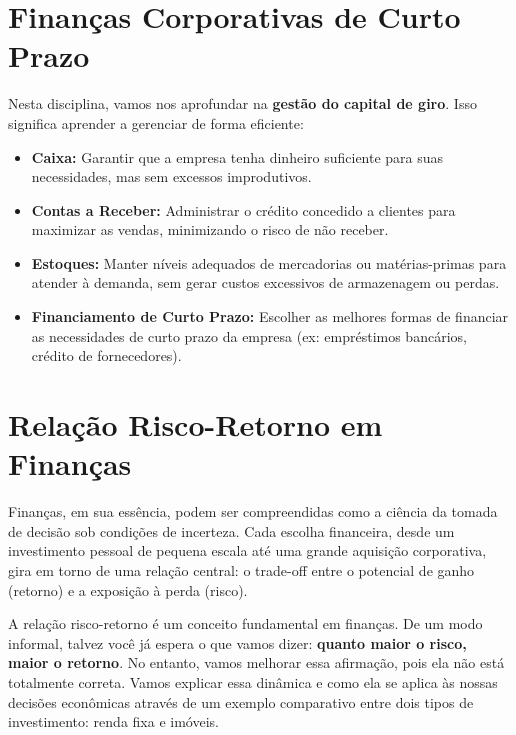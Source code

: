 \documentclass[
  a4paper,
]{book}
\begin{document}
\section{\texorpdfstring{\textbf{Finanças Corporativas de Curto
Prazo}}{Finanças Corporativas de Curto Prazo}}\label{finanuxe7as-corporativas-de-curto-prazo}

Nesta disciplina, vamos nos aprofundar na \textbf{gestão do capital de
giro}. Isso significa aprender a gerenciar de forma eficiente:

\begin{itemize}
\item
  \textbf{Caixa:} Garantir que a empresa tenha dinheiro suficiente para
  suas necessidades, mas sem excessos improdutivos.
\item
  \textbf{Contas a Receber:} Administrar o crédito concedido a clientes
  para maximizar as vendas, minimizando o risco de não receber.
\item
  \textbf{Estoques:} Manter níveis adequados de mercadorias ou
  matérias-primas para atender à demanda, sem gerar custos excessivos de
  armazenagem ou perdas.
\item
  \textbf{Financiamento de Curto Prazo:} Escolher as melhores formas de
  financiar as necessidades de curto prazo da empresa (ex: empréstimos
  bancários, crédito de fornecedores).
\end{itemize}

\section{Relação Risco-Retorno em
Finanças}\label{relauxe7uxe3o-risco-retorno-em-finanuxe7as}

Finanças, em sua essência, podem ser compreendidas como a ciência da
tomada de decisão sob condições de incerteza. Cada escolha financeira,
desde um investimento pessoal de pequena escala até uma grande aquisição
corporativa, gira em torno de uma relação central: o trade-off entre o
potencial de ganho (retorno) e a exposição à perda (risco).

A relação risco-retorno é um conceito fundamental em finanças. De um
modo informal, talvez você já espera o que vamos dizer: \textbf{quanto
maior o risco, maior o retorno}. No entanto, vamos melhorar essa
afirmação, pois ela não está totalmente correta. Vamos explicar essa
dinâmica e como ela se aplica às nossas decisões econômicas através de
um exemplo comparativo entre dois tipos de investimento: renda fixa e
imóveis.
\end{document}
